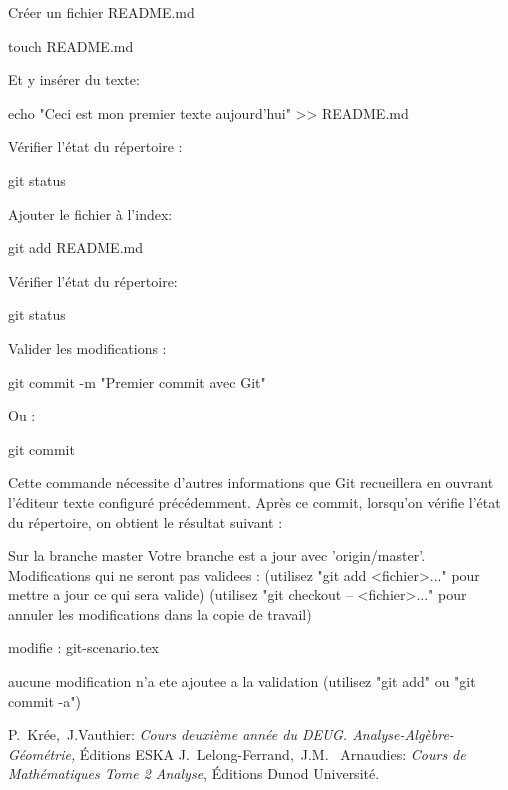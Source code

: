 \documentclass[11pt, a4paper]{book}
\begin{document}
Créer un fichier README.md
\begin{bash}
touch README.md
\end{bash}
Et y insérer du texte:
\begin{bash}
echo "Ceci est mon premier texte aujourd'hui" >> README.md
\end{bash}
Vérifier l'état du répertoire :
\begin{bash}
git status
\end{bash}
Ajouter le fichier à l'index:
\begin{bash}
git add README.md
\end{bash}
Vérifier l'état du répertoire:
\begin{bash}
git status
\end{bash}
Valider les modifications :
\begin{bash}
git commit -m "Premier commit avec Git"
\end{bash}
Ou :
\begin{bash}
git commit
\end{bash}
Cette commande nécessite d'autres informations que Git recueillera en ouvrant l'éditeur texte configuré précédemment.
Après ce commit, lorsqu'on vérifie l'état du répertoire, on obtient le résultat suivant :

\begin{bash}
Sur la branche master
Votre branche est a jour avec 'origin/master'.
Modifications qui ne seront pas validees :
  (utilisez "git add <fichier>..." pour mettre a jour ce qui sera valide)
  (utilisez "git checkout -- <fichier>..." pour annuler les modifications dans la copie de travail)

	modifie :         git-scenario.tex

aucune modification n'a ete ajoutee a la validation (utilisez "git add" ou "git commit -a")

\end{bash}
\begin{thebibliography}{99} 
 P.~Kr\'ee,~J.Vauthier: \emph{Cours deuxi\`eme ann\'ee du DEUG. Analyse-Alg\`ebre-G\'eom\'etrie,}  
\'Editions ESKA 
 J.~Lelong-Ferrand,~J.M. ~Arnaudies: \emph{Cours de Math\'ematiques Tome 2 Analyse},  
\'Editions Dunod Universit\'e.
\end{thebibliography}
\end{document}
